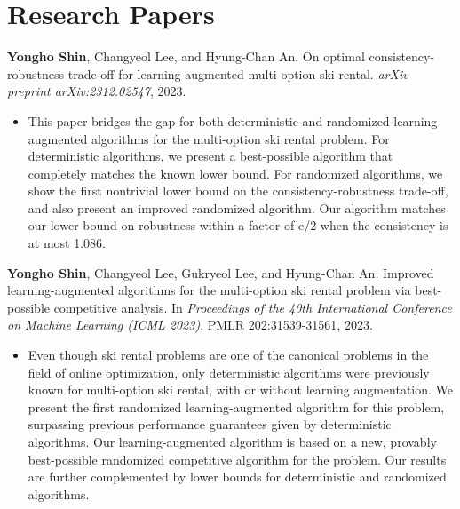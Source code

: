 \documentclass{article}
\newcommand{\killinitspace}{-0.7em}
\begin{document}
\section{Research Papers}
\textbf{Yongho Shin}, Changyeol Lee, and Hyung-Chan An. On optimal consistency-robustness trade-off for learning-augmented multi-option ski rental. \emph{arXiv preprint arXiv:2312.02547}, 2023.
\vspace{\killinitspace}
\begin{itemize}
\item This paper bridges the gap for both deterministic and randomized learning-augmented algorithms for the multi-option ski rental problem. For deterministic algorithms, we present a best-possible algorithm that completely matches the known lower bound. For randomized algorithms, we show the first nontrivial lower bound on the consistency-robustness trade-off, and also present an improved randomized algorithm. Our algorithm matches our lower bound on robustness within a factor of e/2 when the consistency is at most 1.086.
\end{itemize}

\textbf{Yongho Shin}, Changyeol Lee, Gukryeol Lee, and Hyung-Chan An. Improved learning-augmented algorithms for the multi-option ski rental problem via best-possible competitive analysis. In \emph{Proceedings of the 40th International Conference on Machine Learning (ICML 2023)}, PMLR 202:31539-31561, 2023.
\vspace{\killinitspace}
\begin{itemize}
\item %
Even though ski rental problems are one of the canonical problems in the field of online optimization, only deterministic algorithms were previously known for multi-option ski rental, with or without learning augmentation. We present the first randomized learning-augmented algorithm for this problem, surpassing previous performance guarantees given by deterministic algorithms. Our learning-augmented algorithm is based on a new, provably best-possible randomized competitive algorithm for the problem. Our results are further complemented by lower bounds for deterministic and randomized algorithms.
\end{itemize}
\end{document}

